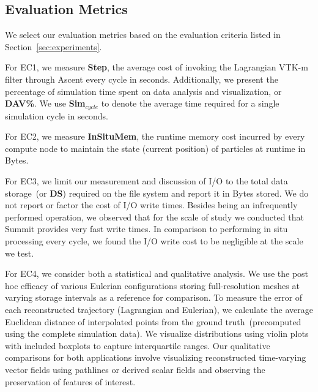 \subsection{Evaluation Metrics}
\label{sec:metrics}
We select our evaluation metrics based on the evaluation criteria listed in Section~\ref{sec:experiments}.
%

For EC1, we measure \textbf{Step}, the average cost of invoking the Lagrangian VTK-m filter through Ascent every cycle in seconds. Additionally, we present the percentage of simulation time spent on data analysis and visualization, or \textbf{DAV\%}.
%
We use \textbf{Sim$_{cycle}$} to denote the average time required for a single simulation cycle in seconds.

For EC2, we measure \textbf{InSituMem}, the runtime memory cost incurred by every compute node to maintain the state (current position) of particles at runtime in Bytes.
%

For EC3, we limit our measurement and discussion of I/O to the total data storage~(or \textbf{DS}) required on the file system and report it in Bytes stored.
%
We do not report or factor the cost of I/O write times. 
%
Besides being an infrequently performed operation, we observed that for the scale of study we conducted that Summit provides very fast write times.
%
In comparison to performing in situ processing every cycle, we found the I/O write cost to be negligible at the scale we test.

For EC4, we consider both a statistical and qualitative analysis. 
%
We use the post hoc efficacy of various Eulerian configurations storing full-resolution meshes at varying storage intervals as a reference for comparison.
%
To measure the error of each reconstructed trajectory (Lagrangian and Eulerian), we calculate the average Euclidean distance of interpolated points from the ground truth~(precomputed using the complete simulation data).
%
We visualize distributions using violin plots with included boxplots to capture interquartile ranges.
%
Our qualitative comparisons for both applications involve visualizing reconstructed time-varying vector fields using pathlines or derived scalar fields and observing the preservation of features of interest.
%
%
%
%

